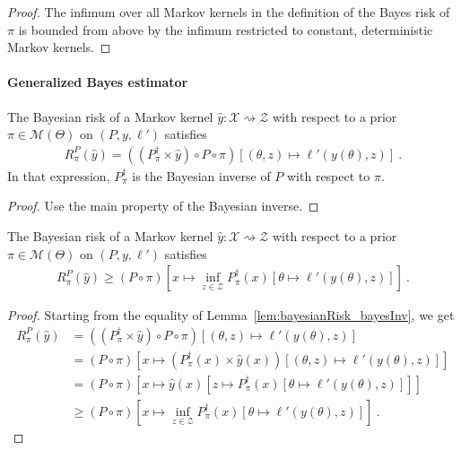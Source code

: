 \begin{proof}\leanok
\uses{}
The infimum over all Markov kernels in the definition of the Bayes risk of $\pi$ is bounded from above by the infimum restricted to constant, deterministic Markov kernels.
\end{proof}

\paragraph{Generalized Bayes estimator}

\begin{lemma}
  \label{lem:bayesianRisk_bayesInv}
  The Bayesian risk of a Markov kernel $\hat{y} : \mathcal X \rightsquigarrow \mathcal Z$ with respect to a prior $\pi \in \mathcal M(\Theta)$ on $(P, y, \ell')$ satisfies
  \begin{align*}
  R^P_\pi(\hat{y}) = ((P_\pi^\dagger \times \hat{y}) \circ P \circ \pi)\left[(\theta, z) \mapsto \ell'(y(\theta), z)\right] \: .
  \end{align*}
  In that expression, $P_\pi^\dagger$ is the Bayesian inverse of $P$ with respect to $\pi$.
\end{lemma}

\begin{proof}%
\uses{}
Use the main property of the Bayesian inverse.
\end{proof}

\begin{lemma}
  \label{lem:bayesianRisk_ge_inf_bayesInv}
  The Bayesian risk of a Markov kernel $\hat{y} : \mathcal X \rightsquigarrow \mathcal Z$ with respect to a prior $\pi \in \mathcal M(\Theta)$ on $(P, y, \ell')$ satisfies
  \begin{align*}
  R^P_\pi(\hat{y}) \ge (P \circ \pi)\left[x \mapsto \inf_{z \in \mathcal Z} P_\pi^\dagger(x) \left[\theta \mapsto \ell'(y(\theta), z)\right]\right] \: .
  \end{align*}
\end{lemma}

\begin{proof}%
{}
Starting from the equality of Lemma~\ref{lem:bayesianRisk_bayesInv}, we get
\begin{align*}
R^P_\pi(\hat{y})
&= ((P_\pi^\dagger \times \hat{y}) \circ P \circ \pi)\left[(\theta, z) \mapsto \ell'(y(\theta), z)\right]
\\
&= (P \circ \pi)\left[x \mapsto (P_\pi^\dagger(x) \times \hat{y}(x)) \left[(\theta, z) \mapsto \ell'(y(\theta), z)\right]\right]
\\
&= (P \circ \pi)\left[x \mapsto \hat{y}(x)\left[z \mapsto P_\pi^\dagger(x) \left[\theta \mapsto \ell'(y(\theta), z)\right]\right]\right]
\\
&\ge (P \circ \pi)\left[x \mapsto \inf_{z \in \mathcal Z} P_\pi^\dagger(x) \left[\theta \mapsto \ell'(y(\theta), z)\right]\right]
\: .
\end{align*}

\end{proof}

